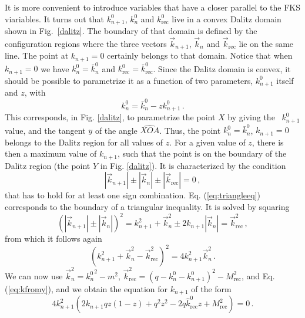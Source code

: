 \documentclass[11pt,a4paper]{article}
\newcommand{\tmop}[1]{\ensuremath{\operatorname{#1}}}
\begin{document}
It is more convenient to introduce variables that have a closer
parallel to the FKS viariables. It turns out that $k^0_{n + 1}$, $k_n^0$ and
$k_{\tmop{rec}}^0$ live in a convex Dalitz domain shown in 
Fig.~\ref{dalitz}.
The boundary of that domain is defined by the configuration regions where the
three vectors $\vec{k}_{n + 1}$, $\vec{k}_n$ and $\vec{k}_{\tmop{rec}}$ lie on
the same line. The point at $k_{n + 1} = 0$ certainly belongs to that domain.
Notice that when $k_{n + 1} = 0$ we have $k^0_n = \bar{k}_n^0$ and
$k^{0_{}}_{\tmop{rec}} = \bar{k}^0_{\tmop{rec}}$. Since the Dalitz domain is
convex, it should be possible to parametrize it as a function of two
parameters, $k^0_{n + 1}$ itself and $z$, with
\begin{equation}
  k^0_n = \bar{k}^0_n - zk^0_{n + 1} \, . \label{eq:kfromy}
\end{equation}
This corresponds, in Fig. \ref{dalitz}, to parametrize the point $X$ by giving
the \ $k^0_{n + 1}$ value, and the tangent $y$ of the angle $\widehat{XOA}$.
Thus, the point $k_n^0 = \bar{k}^0_n$, $k_{n + 1} = 0$ belongs to the Dalitz
region for all values of $z$. For a given value of $z$, there is then a
maximum value of $k_{n + 1}$, such that the point is on the boundary of the
Dalitz region (the point $Y$ in Fig. \ref{dalitz}). It is characterized by the
condition
\begin{equation}
  | \vec{k}_{n + 1} | \pm | \vec{k}_n | \pm | \vec{k}_{\tmop{rec}} | = 0 \, ,
  \label{eq:triangleeq}
\end{equation}
that has to hold for at least one sign combination. Eq. (\ref{eq:triangleeq})
corresponds to the boundary of a triangular inequality. It is solved by
squaring
\begin{equation}
  (| \vec{k}_{n + 1} | \pm | \vec{k}_n |)^2 = k_{n + 1}^2 + \vec{k}_n^2 \pm 2
  k_{n + 1} | \vec{k}_n | = \vec{k}_{\tmop{rec}}^2 \, ,
\end{equation}
from which it follows again
\begin{equation}
  \left( k^2_{n + 1} + \vec{k}^2_n - \vec{k}^2_{\tmop{rec}} \right)^2 = 4 k_{n
  + 1}^2 \vec{k}_n^2 \, .
\end{equation}
We can now use $\vec{k}^2_n = {k^0_n}^2 - m^2$, $\vec{k}_{\tmop{rec}}^2 = (q -
k^0_n - k^0_{n + 1})^2 - M_{\tmop{rec}}^2$, and Eq. (\ref{eq:kfromy}), and we
obtain the equation for $k_{n + 1}$ of the form
\begin{equation}
  4 k_{n + 1}^2 \left( 2 k_{n + 1} qz (1 - z) + q^2 z^2 - 2 q
  \hat{k}^0_{\tmop{rec}} z + M_{\tmop{rec}}^2 \right) = 0 \, .
\end{equation}
\end{document}
